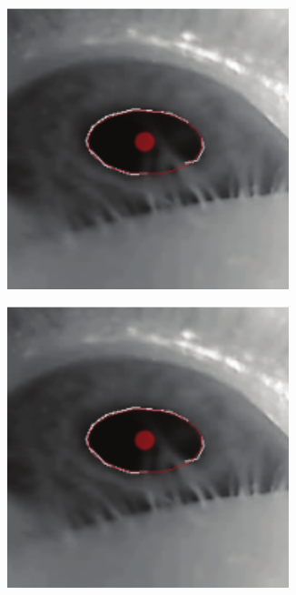 \documentclass[USenglish,twocolumn]{article}
\begin{document}
\begin{figure}[H]
	\captionsetup[subfigure]{justification=centering}
	\centering
	\begin{subfigure}[b]{0.45\textwidth}
		\centering
			\includegraphics[width=0.9\textwidth]{img/PupilLab/6.png}
		\caption{}
		\label{fig:experiment1}
	\end{subfigure}

	\begin{subfigure}[b]{0.45\textwidth}
		\centering
			\includegraphics[width=0.9\textwidth]{img/PupilLab/6.png}
		\caption{}
		\label{fig:experiment2}
	\end{subfigure}


\end{figure}
\end{document}
